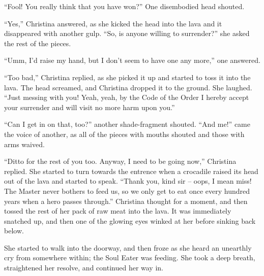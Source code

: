\documentclass[showtrims,b6paper,draft,10pt]{memoir}
\begin{document}
``Fool!  You really think that you have won?''  One disembodied head shouted.

``Yes,''  Christina answered, as she kicked the head into the lava and it disappeared with another gulp.  ``So, is anyone willing to surrender?''  she asked the rest of the pieces.

``Umm, I'd raise my hand, but I don't seem to have one any more,'' one answered.

``Too bad,'' Christina replied, as she picked it up and started to toss it into the lava.  The head screamed, and Christina dropped it to the ground.  She laughed.  ``Just messing with you!  Yeah, yeah, by the Code of the Order I hereby accept your surrender and will visit no more harm upon you.''

``Can I get in on that, too?''  another shade-fragment shouted.  ``And me!'' came the voice of another, as all of the pieces with mouths shouted and those with arms waived.

``Ditto for the rest of you too.  Anyway, I need to be going now,'' Christina replied.  She started to turn towards the entrence when a crocadile raised its head out of the lava and started to speak.  ``Thank you, kind sir -- oops, I mean miss!  The Master never bothers to feed us, so we only get to eat once every hundred years when a hero passes through.''  Christina thought for a moment, and then tossed the rest of her pack of raw meat into the lava.  It was immediately snatched up, and then one of the glowing eyes winked at her before sinking back below.

She started to walk into the doorway, and then froze as she heard an unearthly cry from somewhere within;  the Soul Eater was feeding.  She took a deep breath, straightened her resolve, and continued her way in.

\end{document}

